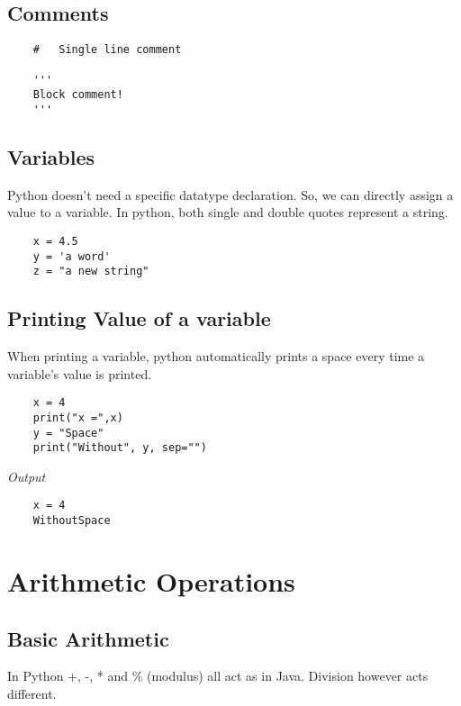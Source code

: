 \documentclass{report}
\begin{document}
	\subsection{Comments}
	\vspace{-15pt}
	\begin{verbatim}
	#   Single line comment
	
	'''
	Block comment!
	'''
	\end{verbatim}
	\vspace{-10pt}
	
	\subsection{Variables}
	Python doesn't need a specific datatype declaration. So, we can directly assign a value to a variable. In python, both single and double quotes represent a string. 
	
	\vspace{-15pt}
	\begin{verbatim}
	x = 4.5
	y = 'a word'
	z = "a new string"
	\end{verbatim}
	\vspace{-10pt}
	
	\subsection{Printing Value of a variable}
	When printing a variable, python automatically prints a space every time a variable's value is printed. 
	
	\vspace{-15pt}
	\begin{verbatim}
	x = 4
	print("x =",x)
	y = "Space"
	print("Without", y, sep="")
	\end{verbatim}
	\vspace{-10pt}
	
	\textit{Output}
	\vspace{-15pt}
	\begin{verbatim}
	x = 4
	WithoutSpace
	\end{verbatim}
	\vspace{-10pt}
	
	\section{Arithmetic Operations}
	\subsection{Basic Arithmetic}
	In Python +, -, * and \% (modulus) all act as in Java. Division however acts different. 
	
\end{document}
